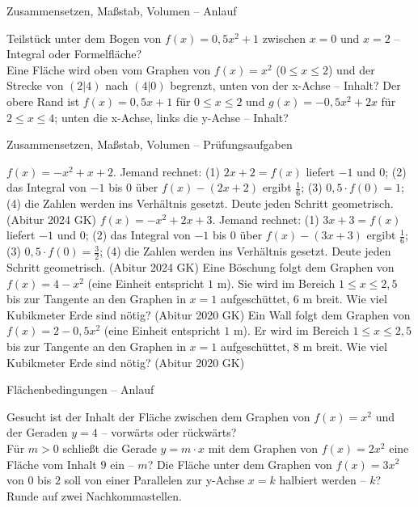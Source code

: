\setcounter{aufgabe}{7}

\begin{aufgabe}{Zusammensetzen, Maßstab, Volumen – Anlauf}
\begin{teile}
\teil Teilstück unter dem Bogen von $f(x) = 0{,}5x^2 + 1$ zwischen $x = 0$ und $x = 2$ – Integral oder Formelfläche? \\ 
\teil Eine Fläche wird oben vom Graphen von $f(x) = x^2$ ($0 \le x \le 2$) und der Strecke von $(2|4)$ nach $(4|0)$ begrenzt, unten von der x-Achse – Inhalt?
\teil Der obere Rand ist $f(x) = 0{,}5x + 1$ für $0 \le x \le 2$ und $g(x) = -0{,}5x^2 + 2x$ für $2 \le x \le 4$; unten die x-Achse, links die y-Achse – Inhalt?
\end{teile}
\end{aufgabe}

\begin{aufgabe}{Zusammensetzen, Maßstab, Volumen – Prüfungsaufgaben}
\begin{teile}
\teil $f(x) = -x^2 + x + 2$. Jemand rechnet: (1) $2x + 2 = f(x)$ liefert $-1$ und $0$; (2) das Integral von $-1$ bis $0$ über $f(x) - (2x + 2)$ ergibt $\frac{1}{6}$; (3) $0{,}5 \cdot f(0) = 1$; (4) die Zahlen werden ins Verhältnis gesetzt. Deute jeden Schritt geometrisch. \hfill (Abitur 2024 GK)
\teil $f(x) = -x^2 + 2x + 3$. Jemand rechnet: (1) $3x + 3 = f(x)$ liefert $-1$ und $0$; (2) das Integral von $-1$ bis $0$ über $f(x) - (3x + 3)$ ergibt $\frac{1}{6}$; (3) $0{,}5 \cdot f(0) = \frac{3}{2}$; (4) die Zahlen werden ins Verhältnis gesetzt. Deute jeden Schritt geometrisch. \hfill (Abitur 2024 GK)
\teil Eine Böschung folgt dem Graphen von $f(x) = 4 - x^2$ (eine Einheit entspricht $1$ m). Sie wird im Bereich $1 \le x \le 2{,}5$ bis zur Tangente an den Graphen in $x = 1$ aufgeschüttet, $6$ m breit. Wie viel Kubikmeter Erde sind nötig? \hfill (Abitur 2020 GK)
\teil Ein Wall folgt dem Graphen von $f(x) = 2 - 0{,}5x^2$ (eine Einheit entspricht $1$ m). Er wird im Bereich $1 \le x \le 2{,}5$ bis zur Tangente an den Graphen in $x = 1$ aufgeschüttet, $8$ m breit. Wie viel Kubikmeter Erde sind nötig? \hfill (Abitur 2020 GK)
\end{teile}
\end{aufgabe}

\begin{aufgabe}{Flächenbedingungen – Anlauf}
\begin{teile}
\teil Gesucht ist der Inhalt der Fläche zwischen dem Graphen von $f(x) = x^2$ und der Geraden $y = 4$ – vorwärts oder rückwärts? \\ 
\teil Für $m > 0$ schließt die Gerade $y = m \cdot x$ mit dem Graphen von $f(x) = 2x^2$ eine Fläche vom Inhalt $9$ ein – $m$?
\teil Die Fläche unter dem Graphen von $f(x) = 3x^2$ von $0$ bis $2$ soll von einer Parallelen zur y-Achse $x = k$ halbiert werden – $k$? Runde auf zwei Nachkommastellen.
\end{teile}
\end{aufgabe}

